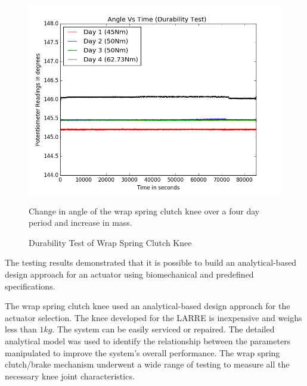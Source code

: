 \begin{figure}[h!]
    \centering
    \includegraphics[scale=0.50]{images/mech_design/Durability_test.png}
    \caption{Durability Test of Wrap Spring Clutch Knee}{Change in angle of the wrap spring clutch knee over a four day period and increase in mass.}
    \label{fig:durabilitytest}
\end{figure}


The testing results demonstrated that it is possible to build an analytical-based design approach for an actuator using biomechanical and predefined specifications.


The wrap spring clutch knee used an analytical-based design approach for the actuator selection. The knee developed for the LARRE is inexpensive and weighs less than  $1kg$. The system can be easily serviced or repaired. The detailed analytical model was used to identify the relationship between the parameters manipulated to improve the system's overall performance. The wrap spring clutch/brake mechanism underwent a wide range of testing to measure all the necessary knee joint characteristics. 


